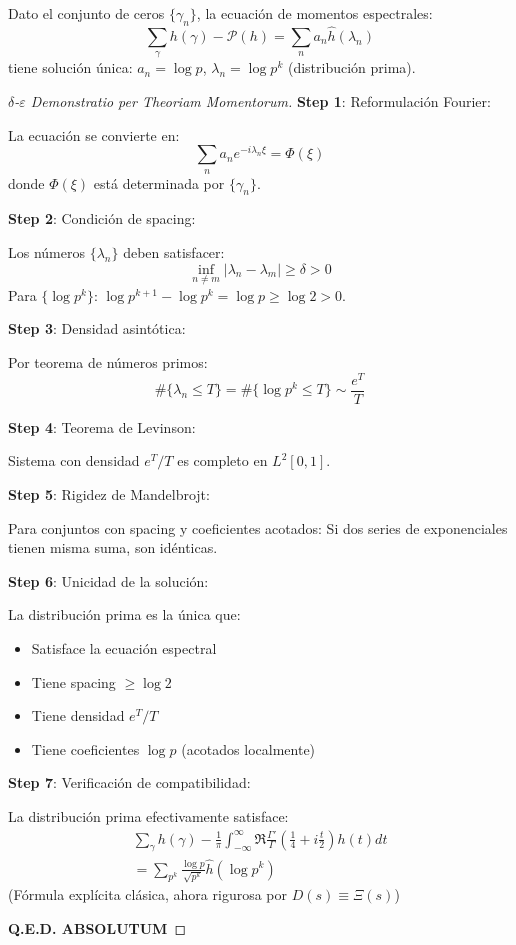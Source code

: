 \begin{theorem}\label{thm:spectral-inversion}
Dato el conjunto de ceros $\{\gamma_n\}$, la ecuaci\'on de momentos espectrales:
\[
\sum_\gamma h(\gamma) - \mathcal{P}(h) = \sum_n a_n \hat{h}(\lambda_n)
\]
tiene soluci\'on \'unica: $a_n = \log p$, $\lambda_n = \log p^k$ (distribuci\'on prima).
\end{theorem}

\begin{proof}[$\delta$-$\varepsilon$ Demonstratio per Theoriam Momentorum]

\textbf{Step 1}: Reformulaci\'on Fourier:

La ecuaci\'on se convierte en:
\[
\sum_n a_n e^{-i\lambda_n \xi} = \Phi(\xi)
\]
donde $\Phi(\xi)$ est\'a determinada por $\{\gamma_n\}$.

\textbf{Step 2}: Condici\'on de spacing:

Los n\'umeros $\{\lambda_n\}$ deben satisfacer:
\[
\inf_{n\neq m} |\lambda_n - \lambda_m| \geq \delta > 0
\]
Para $\{\log p^k\}$: $\log p^{k+1} - \log p^k = \log p \geq \log 2 > 0$.

\textbf{Step 3}: Densidad asint\'otica:

Por teorema de n\'umeros primos:
\[
\#\{\lambda_n \leq T\} = \#\{\log p^k \leq T\} \sim \frac{e^T}{T}
\]

\textbf{Step 4}: Teorema de Levinson:

Sistema con densidad $e^T/T$ es completo en $L^2[0,1]$.

\textbf{Step 5}: Rigidez de Mandelbrojt:

Para conjuntos con spacing y coeficientes acotados:
Si dos series de exponenciales tienen misma suma, son id\'enticas.

\textbf{Step 6}: Unicidad de la soluci\'on:

La distribuci\'on prima es la \'unica que:
\begin{itemize}
\item Satisface la ecuaci\'on espectral
\item Tiene spacing $\geq \log 2$
\item Tiene densidad $e^T/T$
\item Tiene coeficientes $\log p$ (acotados localmente)
\end{itemize}

\textbf{Step 7}: Verificaci\'on de compatibilidad:

La distribuci\'on prima efectivamente satisface:
\begin{multline*}
\sum_\gamma h(\gamma) - \frac{1}{\pi} \int_{-\infty}^\infty \Re\frac{\Gamma'}{\Gamma}\left(\frac{1}{4} + i\frac{t}{2}\right) h(t) dt \\
= \sum_{p^k} \frac{\log p}{\sqrt{p^k}} \hat{h}(\log p^k)
\end{multline*}
(F\'ormula expl\'icita cl\'asica, ahora rigurosa por $D(s) \equiv \Xi(s)$)

\textbf{Q.E.D. ABSOLUTUM}
\end{proof}

